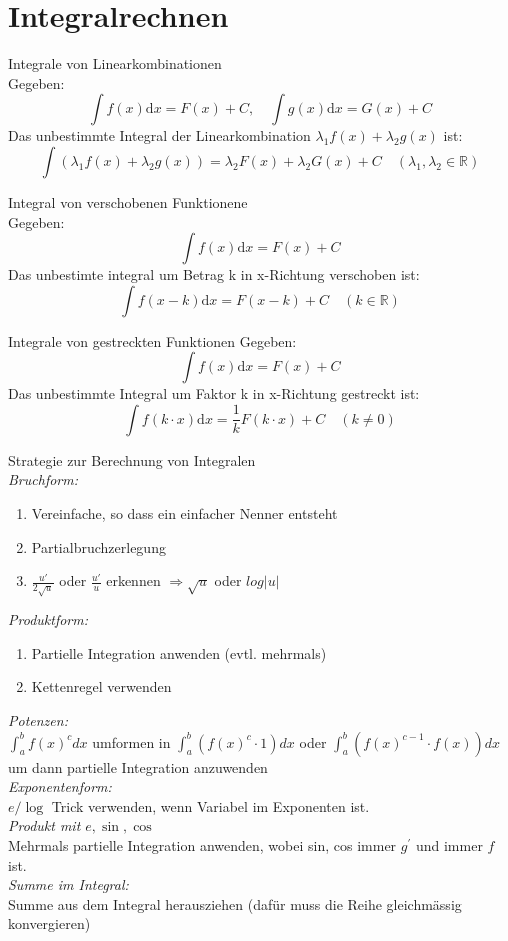 
\section{Integralrechnen}



\begin{definition}{Integrale von Linearkombinationen}\\
	Gegeben:
	\[\int{f(x)\mathrm{d}x} = F(x)+C, \quad  \int{g(x)\mathrm{d}x} = G(x)+C\]
	Das unbestimmte Integral der Linearkombination \(\lambda_1f(x) + \lambda_2g(x)\) ist:
	\[\int{(\lambda_1f(x)+\lambda_2g(x))} = \lambda_2F(x)+\lambda_2G(x)+C \quad (\lambda_1,\lambda_2 \in \mathbb{R} )\]
\end{definition}
\begin{definition}{Integral von verschobenen Funktionene}\\
	Gegeben:
	\[\int{f(x)\mathrm{d}x} = F(x) + C \]
	Das unbestimte integral um Betrag k in x-Richtung verschoben ist:
	\[\int{f(x-k)\mathrm{d}x}= F(x-k)+C \quad (k \in \mathbb{R}) \]
\end{definition}
\begin{definition}{Integrale von gestreckten Funktionen}
	Gegeben:
	\[\int{f(x)\mathrm{d}x} = F(x)+C \]
	Das unbestimmte Integral um Faktor k in x-Richtung gestreckt ist:
	\[\int{f(k\cdot x)\mathrm{d}x}= \frac{1}{k}F(k\cdot x)+C \quad (k\neq0 )\]
\end{definition}

\begin{KR}{Strategie zur Berechnung von Integralen}
    \\\emph{Bruchform:}
    \begin{enumerate}
        \item Vereinfache, so dass ein einfacher Nenner entsteht
        \item Partialbruchzerlegung
        \item $\frac{u'}{2\sqrt{u}}$ oder $\frac{u'}{u}$ erkennen $\Rightarrow \sqrt{u}$ oder $log|u|$
    \end{enumerate}
    \emph{Produktform:}
    \begin{enumerate}
        \item Partielle Integration anwenden (evtl. mehrmals)
        \item Kettenregel verwenden
    \end{enumerate}
    \emph{Potenzen:}\\
        $\int_{a}^{b} f(x)^{c} d x$ umformen in $\int_{a}^{b}(f(x)^{c} \cdot 1) d x$ oder $\int_{a}^{b}(f(x)^{c-1} \cdot f(x)) d x$ um dann partielle Integration anzuwenden\\
    \emph{Exponentenform:}\\
        $e / \log$ Trick verwenden, wenn Variabel im Exponenten ist.\\
    \emph{Produkt mit $e, \sin , \cos$}\\
        Mehrmals partielle Integration anwenden, wobei sin, cos immer $g^{\prime}$ und immer $f$ ist.\\
    \emph{Summe im Integral:}\\
        Summe aus dem Integral herausziehen (dafür muss die Reihe gleichmässig konvergieren)
\end{KR}

